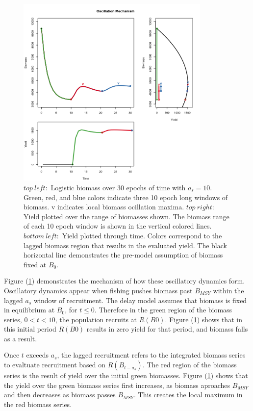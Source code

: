 \begin{figure}[h!]
\centering
\includegraphics[width=0.85\textwidth]{../ddBias/shockBiomassYeild.png}
\vspace{-0.5cm}
\caption{$top~left:$ Logistic biomass over 30 epochs of time with $a_s=10$.
Green, red, and blue colors indicate three 10 epoch long windows of biomass.
v indicates local biomass ocillation maxima.
$top~right:$ Yield plotted over the range of biomasses shown.
The biomass range of each 10 epoch window is shown in the vertical colored lines.
$bottom~left:$ Yield plotted through time. Colors correspond to the
lagged biomass region that results in the evaluated yield. The black horizontal
line demonstrates the pre-model assumption of biomass fixed at $B_0$.
}
\label{shock}
\end{figure}


%
Figure (\ref{shock}) demonstrates the mechanism of how these oscillatory
dynamics form. Oscillatory dynamics appear when fishing pushes biomass past
$B_{MSY}$ within the lagged $a_s$ window of recruitment. The delay model assumes that
biomass is fixed in equilibrium at $B_0$, for $t\le0$. Therefore in the green region of
the biomass series, $0<t<10$, the population recruits at $R(B0)$. Figure (\ref{shock})
shows that in this initial period $R(B0)$ results in zero yield for that
period, and biomass falls as a result.

%
Once $t$ exceeds $a_s$, the lagged recruitment refers to the integrated
biomass series to evaltuate recruitment based on $R(B_{t-a_s})$. The red
region of the biomass series is the result of yield over the initial
green biomasses. Figure (\ref{shock}) shows that the yield over the green biomass
series first increases, as biomass aproaches $B_{MSY}$ and then decreases as biomass
passes $B_{MSY}$. This creates the local maximum in the red biomass series.

